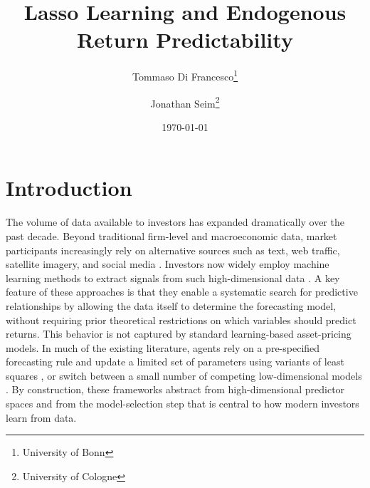 \documentclass[11pt]{article}
\title{Lasso Learning and Endogenous Return Predictability}
\author{
Tommaso Di Francesco\thanks{University of Bonn}
\and
Jonathan Seim\thanks{University of Cologne}
}
\date{\today}
\begin{document}
\pretitle{\begin{center}\bfseries\LARGE}
\posttitle{\end{center}}



{
\maketitle
}



\section*{Introduction}

The volume of data available to investors has expanded dramatically over the past decade.
Beyond traditional firm-level and macroeconomic data, market participants increasingly rely on alternative sources such as text, web traffic, satellite imagery, and social media \citep{DataSphere2025}.
Investors now widely employ machine learning methods to extract signals from such high-dimensional data \citep{Mercer2024AI}.
A key feature of these approaches is that they enable a systematic search for predictive relationships by allowing the data itself to determine the forecasting model, without requiring prior theoretical restrictions on which variables should predict returns.
This behavior is not captured by standard learning-based asset-pricing models.
In much of the existing literature, agents rely on a pre-specified forecasting rule and update a limited set of parameters using variants of least squares \citep{Timmermann1993,hong2007simple}, or switch between a small number of competing low-dimensional models \citep{barberis1998model}.
By construction, these frameworks abstract from high-dimensional predictor spaces and from the model-selection step that is central to how modern investors learn from data.
\end{document}
